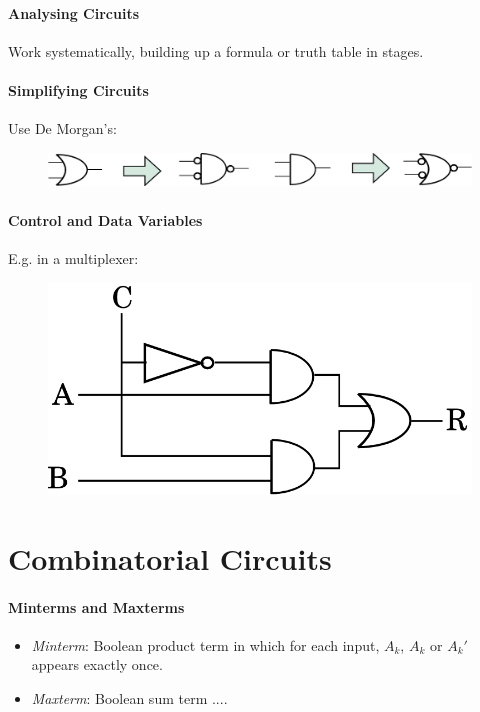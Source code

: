 \documentclass[twocolumn,english]{article}
\begin{document}
\paragraph{Analysing Circuits}

Work systematically, building up a formula or truth table in stages.


\paragraph{Simplifying Circuits}

Use De Morgan's:

\begin{figure}[H]
\noindent \centering{}\includegraphics[width=0.25\paperwidth]{img/simplify}
\end{figure}



\paragraph{Control and Data Variables}

E.g. in a multiplexer:

\begin{figure}[H]
\noindent \centering{}\includegraphics[width=0.15\paperwidth]{img/mux}
\end{figure}



\section{Combinatorial Circuits}


\paragraph{Minterms and Maxterms}
\begin{itemize}
\item \emph{Minterm}: Boolean product term in which for each input, $A_{k}$,
$A_{k}$ or $A_{k}'$ appears exactly once.
\item \emph{Maxterm}: Boolean sum term ....
\end{itemize}
\end{document}
